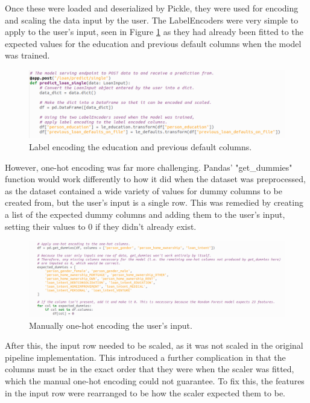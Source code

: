 \documentclass[12pt]{report}
\begin{document}
\noindent Once these were loaded and deserialized by Pickle, they were used for encoding and scaling the data input by the user.
The LabelEncoders were very simple to apply to the user's input, seen in Figure \ref{fig:UviLabelEncoding} as they had already 
been fitted to the expected values for the education and previous default columns when the model was trained.

\begin{figure}[H]
    \centering
    \includegraphics[width=\linewidth]{Implementation/JAN 10 UPDATES/NewUviEncoding1.png}
    \caption{Label encoding the education and previous default columns.}
    \label{fig:UviLabelEncoding}
\end{figure}

\pagebreak 
\noindent However, one-hot encoding was far more challenging. Pandas' "get\_dummies" function would work differently to how 
it did when the dataset was preprocessed, as the dataset contained a wide variety of values for dummy columns to be created from,
but the user's input is a single row. This was remedied by creating a list of the expected dummy columns and adding them to the user's 
input, setting their values to 0 if they didn't already exist.

\begin{figure}[H]
    \centering
    \includegraphics[width=\linewidth]{Implementation/JAN 10 UPDATES/NewUviEncoding2.png}
    \caption{Manually one-hot encoding the user's input.}
    \label{fig:UviOneHot}
\end{figure}

\noindent After this, the input row needed to be scaled, as it was not scaled in the original pipeline implementation.
This introduced a further complication in that the columns must be in the exact order that they were when the scaler was fitted,
which the manual one-hot encoding could not guarantee. To fix this, the features in the input row were rearranged to be how the scaler 
expected them to be.
\end{document}

